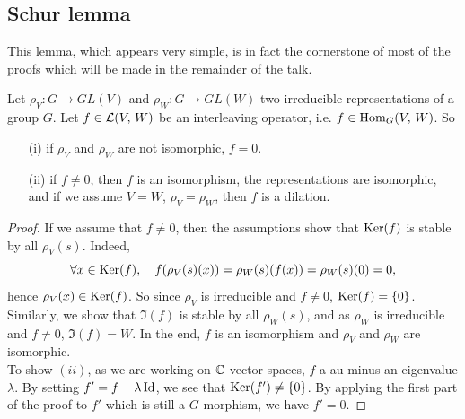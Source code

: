 \subsection{Schur lemma}
 
 
This lemma, which appears very simple, is in fact the cornerstone of most of the proofs which will be made in the remainder of the talk.
 
 
 
 
\begin{lem}
\label{lemma-schur}
   Let $\rho_V: G \rightarrow GL (V) $ and $\rho_W: G \rightarrow GL (W) $ two irreducible representations of a group $G$. Let $ f \in \mathcal{L} (V, \, W) $ be an interleaving operator, i.e. $ f \in \operatorname{Hom}_G (V, \, W) $. So \begin{itemize}
\item [{\upshape (i)}] if $\rho_V $ and $\rho_W $ are not isomorphic, $ f = 0 $.
\item [{\upshape (ii)}] if $ f \neq 0 $, then $ f $ is an isomorphism, the representations are isomorphic, and if we assume $ V = W $, $\rho_V = \rho_W $, then $ f $ is a dilation.
\end{itemize}
\end{lem}
\begin{proof}
\label{notation-82} \label{notation-83} If we assume that $ f \neq 0 $, then the assumptions show that $\operatorname{Ker} (f) $ is stable by all $\rho_V (s) $. Indeed,
\begin{equation*}
\forall x \in \operatorname{Ker} (f), \quad f(\rho_V (s) (x)) = \rho_W (s) (f(x)) = \rho_W (s) (0) = 0,
\end{equation*}
hence $\rho_V (x) \in \operatorname{Ker} (f) $. So since $\rho_V $ is irreducible and $ f \neq 0 $, $\operatorname{Ker} (f) = \{0\} $. Similarly, we show that $\Im (f) $ is stable by all $\rho_W (s) $, and as $\rho_W $ is irreducible and $ f \neq 0 $, $\Im (f) = W $. In the end, $ f $ is an isomorphism and $\rho_V $ and $\rho_W $ are isomorphic. \\To show $ (ii) $, as we are working on $\mathbb{C}$-vector spaces, $ f $ a au minus an eigenvalue $ \lambda $. By setting $ f'= f - \lambda \operatorname{Id} $, we see that $ \operatorname{Ker} (f') \neq \{0\} $. By applying the first part of the proof to $ f'$ which is still a $G$-morphism, we have $ f' = 0 $.
\end{proof}
 
